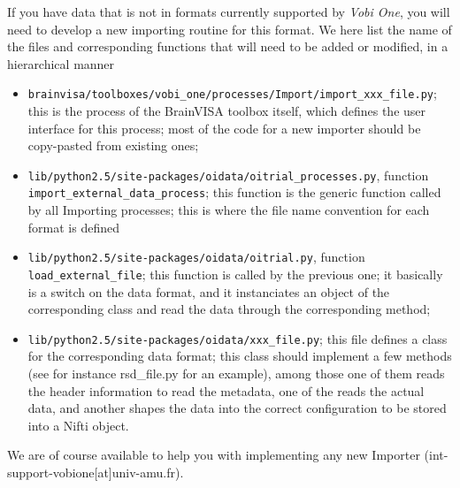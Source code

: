 If you have data that is not in formats currently supported by {\em Vobi One}, you will need to develop a new importing routine for this format. We here list the name of the files and corresponding functions that will need to be added or modified, in a hierarchical manner
\begin{itemize}
        \item \texttt{brainvisa/toolboxes/vobi\_one/processes/Import/import\_xxx\_file.py}; this is the process of the BrainVISA toolbox itself, which defines the user interface for this process; most of the code for a new importer should be copy-pasted from existing ones; 
        \item \texttt{lib/python2.5/site-packages/oidata/oitrial\_processes.py}, function \texttt{import\_external\_data\_process}; this function is the generic function called by all Importing processes; this is where the file name convention for each format is defined
        \item \texttt{lib/python2.5/site-packages/oidata/oitrial.py}, function \texttt{load\_external\_file}; this function is called by the previous one; it basically is a switch on the data format, and it instanciates an object of the corresponding class and read the data through the corresponding method;
        \item \texttt{lib/python2.5/site-packages/oidata/xxx\_file.py}; this file defines a class for the corresponding data format; this class should implement a few methods (see for instance rsd\_file.py for an example), among those one of them reads the header information to read the metadata, one of the reads the actual data, and another shapes the data into the correct configuration to be stored into a Nifti object.
\end{itemize}

We are of course available to help you with implementing any new Importer (int-support-vobione[at]univ-amu.fr).

